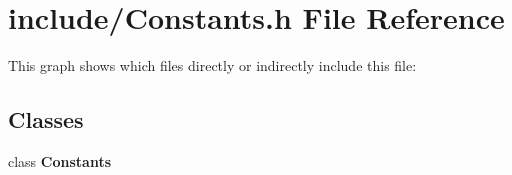 \section{include/\+Constants.h File Reference}
\label{_constants_8h}
This graph shows which files directly or indirectly include this file\+:
\subsection*{Classes}
\begin{DoxyCompactItemize}
\item 
class \textbf{ Constants}
\end{DoxyCompactItemize}
